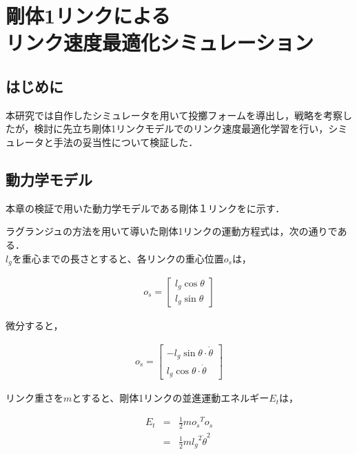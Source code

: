 \chapter[剛体1リンクによるリンク速度最適化シミュレーション]{剛体1リンクによる\\リンク速度最適化シミュレーション}

\section{はじめに}
本研究では自作したシミュレータを用いて投擲フォームを導出し，戦略を考察したが，検討に先立ち剛体1リンクモデルでのリンク速度最適化学習を行い，シミュレータと手法の妥当性について検証した．
\section{動力学モデル}
本章の検証で用いた動力学モデルである剛体１リンクをに示す．\\


ラグランジュの方法\cite{lagrange}を用いて導いた剛体1リンクの運動方程式は，次の通りである．\\
$l_{g}$を重心までの長さとすると、各リンクの重心位置$o_{s}$は，

\begin{eqnarray}
  o_{s} = 
              \begin{bmatrix}
              l_{g}\cos\theta\\
              l_{g}\sin\theta
              \end{bmatrix}
\end{eqnarray}

微分すると，

\begin{eqnarray}
  o_{\dot{s}} = 
              \begin{bmatrix}
              -l_{g}\sin\theta \cdot \dot{\theta}\\
              l_{g}\cos\theta \cdot \dot{\theta}
              \end{bmatrix}
\end{eqnarray}

リンク重さを$m$とすると、剛体1リンクの並進運動エネルギー$E_{t}$は，

\begin{eqnarray}
  E_{t} 
  &=&\frac{1}{2}mo_{\dot{s}}{}^T\!o_{\dot{s}} \nonumber \\
  &=&\frac{1}{2}m{l_{g}}^2{\dot{\theta}}^2
\end{eqnarray}

